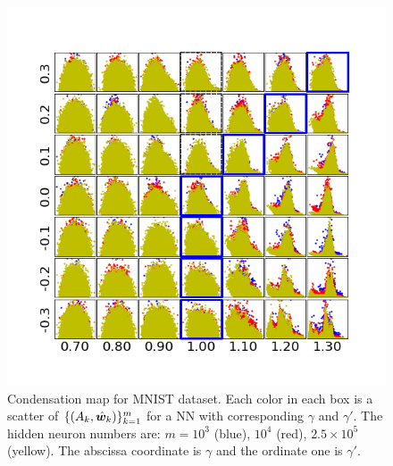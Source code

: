 \documentclass[twoside,11pt]{article}
\begin{document}
\begin{figure}
    \centering
    \includegraphics[scale=0.8]{pic/scalestudym2/angleamptogether.png}
    \caption{Condensation map for MNIST dataset. Each color in each box is a scatter of $\{(A_k,\hat{\bm{w}}_k)\}_{k=1}^m$ for a NN with corresponding $\gamma$ and $\gamma'$. The hidden neuron numbers are:  $m=10^{3}$ (blue), $10^{4}$ (red), $2.5\times 10^{5}$ (yellow). The abscissa coordinate is $\gamma$ and the ordinate one is $\gamma'$.}
    \label{fig:mnistcdnmap}
\end{figure}

\end{document}
